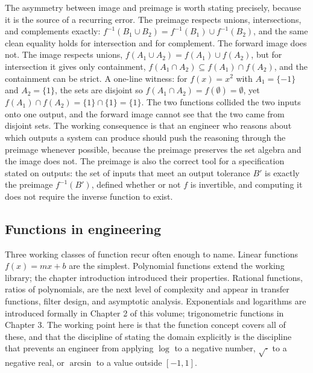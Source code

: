 The asymmetry between image and preimage is worth stating precisely,
because it is the source of a recurring error. The preimage respects
unions, intersections, and complements exactly: $f^{-1}(B_{1} \cup
B_{2}) = f^{-1}(B_{1}) \cup f^{-1}(B_{2})$, and the same clean equality
holds for intersection and for complement. The forward image does not.
The image respects unions, $f(A_{1} \cup A_{2}) = f(A_{1}) \cup
f(A_{2})$, but for intersection it gives only containment, $f(A_{1} \cap
A_{2}) \subseteq f(A_{1}) \cap f(A_{2})$, and the containment can be
strict. A one-line witness: for $f(x) = x^{2}$ with $A_{1} = \{-1\}$ and
$A_{2} = \{1\}$, the sets are disjoint so $f(A_{1} \cap A_{2}) =
f(\emptyset) = \emptyset$, yet $f(A_{1}) \cap f(A_{2}) = \{1\} \cap \{1\}
= \{1\}$. The two functions collided the two inputs onto one output, and
the forward image cannot see that the two came from disjoint sets. The
working consequence is that an engineer who reasons about which outputs a
system can produce should push the reasoning through the preimage
whenever possible, because the preimage preserves the set algebra and the
image does not. The preimage is also the correct tool for a
specification stated on outputs: the set of inputs that meet an output
tolerance $B'$ is exactly the preimage $f^{-1}(B')$, defined whether or
not $f$ is invertible, and computing it does not require the inverse
function to exist.

\subsection{Functions in engineering}

Three working classes of function recur often enough to name. Linear
functions $f(x) = mx + b$ are the simplest. Polynomial functions
extend the working library; the chapter introduction introduced
their properties. Rational functions, ratios of polynomials, are
the next level of complexity and appear in transfer functions,
filter design, and asymptotic analysis. Exponentials and logarithms
are introduced formally in Chapter 2 of this volume; trigonometric
functions in Chapter 3. The working point here is that the function
concept covers all of these, and that the discipline of stating the
domain explicitly is the discipline that prevents an engineer from
applying $\log$ to a negative number, $\sqrt{\cdot}$ to a negative
real, or $\arcsin$ to a value outside $[-1, 1]$.

